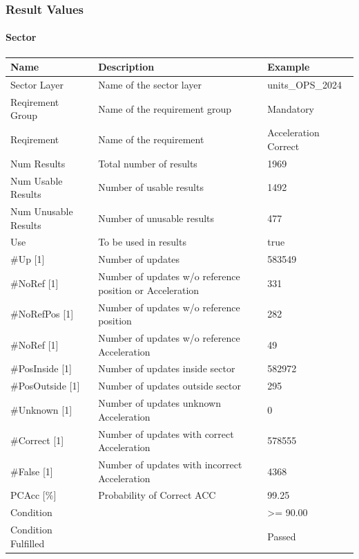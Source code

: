 \subsubsection{Result Values}

\paragraph{Sector}

\begin{center}
 \begin{table}[H]
  \begin{tabularx}{\textwidth}{ | l | X |  l | }
    \hline
    \textbf{Name} & \textbf{Description} & \textbf{Example} \\ \hline
    Sector Layer & Name of the sector layer & units\_OPS\_2024 \\ \hline
    Reqirement Group & Name of the requirement group & Mandatory \\ \hline
    Reqirement & Name of the requirement & Acceleration Correct \\ \hline
    Num Results & Total number of results & 1969 \\ \hline
    Num Usable Results & Number of usable results & 1492 \\ \hline
    Num Unusable Results & Number of unusable results & 477 \\ \hline
    Use & To be used in results & true \\ \hline
    \#Up [1] & Number of updates & 583549 \\ \hline
    \#NoRef [1] & Number of updates w/o reference position or Acceleration & 331 \\ \hline
    \#NoRefPos [1] & Number of updates w/o reference position & 282 \\ \hline
    \#NoRef [1] & Number of updates w/o reference Acceleration & 49 \\ \hline
    \#PosInside [1] & Number of updates inside sector & 582972 \\ \hline
    \#PosOutside [1] & Number of updates outside sector & 295 \\ \hline
    \#Unknown [1] & Number of updates unknown Acceleration & 0 \\ \hline
    \#Correct [1] & Number of updates with correct Acceleration & 578555 \\ \hline
    \#False [1] & Number of updates with incorrect Acceleration & 4368 \\ \hline
    PCAcc [\%] & Probability of Correct ACC & 99.25 \\ \hline
    Condition &  & >= 90.00 \\ \hline
    Condition Fulfilled &  & Passed \\ \hline
    \end{tabularx}
\end{table}
\end{center}

